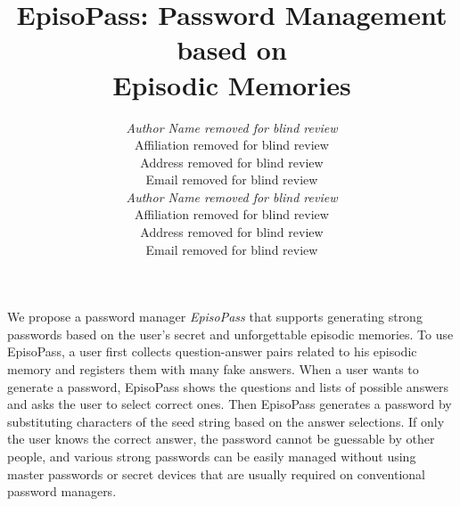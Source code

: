 \documentclass{article}
\begin{document}

\title{EpisoPass: Password Management based on \\ Episodic Memories}

\author{
\parbox[t]{9cm}{\centering
	     {\em Author Name removed for blind review}\\
	     Affiliation removed for blind review\\
	     Address removed for blind review\\
	     Email removed for blind review}
\parbox[t]{9cm}{\centering
	     {\em Author Name removed for blind review}\\
	     Affiliation removed for blind review\\
	     Address removed for blind review\\
	     Email removed for blind review}
}

\maketitle

\abstract

%
%

We propose a password manager \textit{EpisoPass} that supports
generating strong passwords based on the user's secret and unforgettable
episodic memories.
%
To use EpisoPass,
a user first collects question-answer pairs related to his episodic memory
and registers them with many fake answers.
%
When a user wants to generate a password,
EpisoPass shows the questions and lists of possible answers and asks
the user to select correct ones.
Then EpisoPass generates a password by substituting characters of the
seed string based on the answer selections.
%
If only the user knows the correct answer,
the password cannot be guessable by other people, and
various strong passwords can be easily managed
without using master passwords or secret devices that are
usually required on conventional password managers.
%
\end{document}
